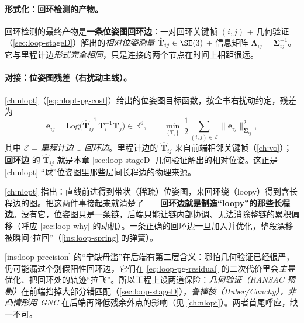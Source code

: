 \paragraph{形式化：回环检测的产物。}
回环检测的最终产物是\textbf{一条位姿图回环边}：一对回环关键帧 $(i,j)$ + 几何验证（\cref{sec:loop-stageD}）解出的\emph{相对位姿测量} $\hat{\mathbf T}_{ij}\in\SE(3)$ + 信息矩阵 $\boldsymbol\Lambda_{ij}=\boldsymbol\Sigma_{ij}^{-1}$。它与里程计边\emph{形式完全相同}，只是连接的两个节点在时间上相距很远。

\paragraph{对接：位姿图残差（右扰动主线）。}
\cref{ch:nlopt}（\cref{eq:nlopt-pg-cost}）给出的位姿图目标函数，按全书右扰动约定，残差为
\begin{equation}
  \mathbf e_{ij}=\mathrm{Log}\!\big(\hat{\mathbf T}_{ij}^{-1}\,\mathbf T_i^{-1}\mathbf T_j\big)\in\mathbb{R}^6,\qquad
  \min_{\{\mathbf T_i\}}\ \frac12\sum_{(i,j)\in\mathcal E}\lVert\mathbf e_{ij}\rVert_{\boldsymbol\Sigma_{ij}}^2,
  \label{eq:loop-pg-residual}
\end{equation}
其中 $\mathcal E$ = \emph{里程计边} $\cup$ \emph{回环边}。里程计边的 $\hat{\mathbf T}_{ij}$ 来自前端相邻关键帧（\cref{ch:vo}）；\textbf{回环边} 的 $\hat{\mathbf T}_{ij}$ 就是本章 \cref{sec:loop-stageD} 几何验证解出的相对位姿。这正是 \cref{ch:nlopt} “球”位姿图里那些层间长程边的物理来源。

\begin{insight}\label{ins:loop-loopy}
\cref{ch:nlopt} 指出：直线前进得到带状（稀疏）位姿图，来回环绕（loopy）得到含长程边的图。把这两件事接起来就清楚了——\textbf{回环边就是制造“loopy”的那些长程边}。没有它，位姿图只是一条链，后端只能让链内部协调、无法消除整链的累积偏移（呼应 \cref{sec:loop-why} 的动机）。一条正确的回环边一旦加入并优化，整段漂移被瞬间“拉回”（\cref{ins:loop-spring} 的弹簧）。
\end{insight}

\begin{pitfall}[陷阱：假阳性回环边 = 后端灾难，需双保险]
\cref{ins:loop-precision} 的“宁缺毋滥”在后端有第二层含义\cite{gaoxiang2019slam14}：哪怕几何验证已经很严，仍可能漏过个别假阳性回环边，它们在 \cref{eq:loop-pg-residual} 的二次代价里会\emph{主导}优化、把回环处的轨迹“拉飞”。所以工程上设两道保险：\emph{几何验证（RANSAC 预剔）}在前端挡掉大部分错匹配（\cref{sec:loop-stageD}），\emph{鲁棒核（Huber/Cauchy），非凸情形用 GNC} 在后端再降低残余外点的影响（见 \cref{ch:nlopt}）。两者首尾呼应，缺一不可。
\end{pitfall}

